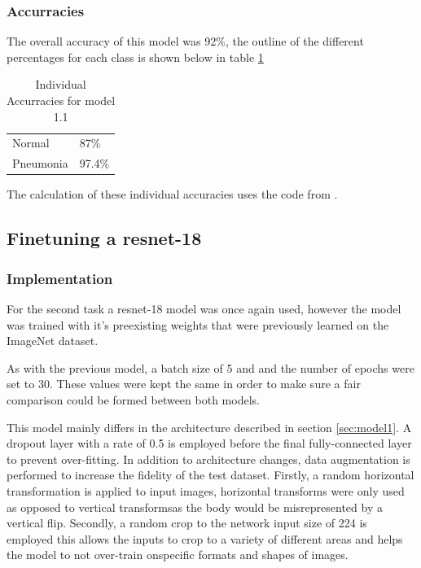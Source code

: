\documentclass[twocolumn]{article}
\begin{document}
\subsubsection{Accurracies}

The overall accuracy of this model was 92\%, the outline of the different percentages for each class is shown below in table \ref{tab:1} 

\begin{table}[h]
	\begin{tabular}{ll}
		Normal    & 87\% \\
		Pneumonia & 97.4\%
	\end{tabular}
	\caption{Individual Accurracies for model 1.1}
	\label{tab:1}
\end{table}


The calculation of these individual accuracies uses the code from \cite{training}. 

\subsection{Finetuning a resnet-18}
\subsubsection{Implementation}
	For the second task a resnet-18 model was once again used, however the model was trained with it's preexisting weights that were previously learned on the ImageNet dataset.\par 

	As with the previous model, a batch size of 5 and and the number of epochs were set to 30. These values were kept the same in order to make sure a fair comparison could be formed between both models. \par

	This model mainly differs in the architecture described in section \ref{sec:model1}. A dropout layer with a rate of 0.5 is employed before the final fully-connected layer to prevent over-fitting. In addition to architecture changes, data augmentation is performed to increase the fidelity of the test dataset. Firstly, a random horizontal transformation is applied to input images, horizontal transforms were only used as opposed to vertical transformsas the body would be misrepresented by a vertical flip. Secondly, a random crop to the network input size of 224 is employed this allows the inputs to crop to a variety of different areas and helps the model to not over-train onspecific formats and shapes of images.
\end{document}
